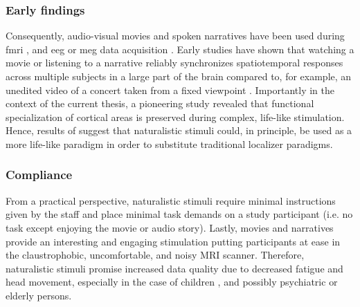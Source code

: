 \subsubsection{Early findings}
Consequently, audio-visual movies and spoken narratives have been used during
\ac{fmri} \citep[cf.][for reviews]{hamilton2018revolution,
hasson2008neurocinematics, sonkusare2019naturalistic,
saarimaki2021naturalistic}, and \ac{eeg} or \ac{meg} data acquisition
\citep[s.][for reviews]{alday2019meg, kandylaki2019story}.
Early studies have shown that watching a movie \citep{hasson2004intersubject,
hasson2008neurocinematics, hasson2010reliability} or listening to a narrative
\citep{lerner2011topographic, wilson2008beyond} reliably synchronizes
spatiotemporal responses across multiple subjects in a large part of the brain
compared to, for example, an unedited video of a concert taken from a fixed
viewpoint \citep{hasson2004intersubject, hasson2008neurocinematics,
hasson2010reliability, lerner2011topographic, wilson2008beyond}.
Importantly in the context of the current thesis, a pioneering study
\citep{bartels2004mapping} revealed that functional specialization of cortical
areas is preserved during complex, life-like stimulation.
Hence, results of \citet{bartels2004mapping} suggest that naturalistic stimuli
could, in principle, be used as a more life-like paradigm in order to substitute
traditional localizer paradigms.


\subsubsection{Compliance}

From a practical perspective, naturalistic stimuli require minimal instructions
given by the staff and place minimal task demands on a study participant (i.e.
no task except enjoying the movie or audio story).
%
Lastly, movies and narratives provide an interesting and engaging stimulation
putting participants at ease in the claustrophobic, uncomfortable, and noisy MRI
scanner.
%
Therefore, naturalistic stimuli promise increased data quality due to decreased
fatigue and head movement, especially in the case of children
\citep{vanderwal2015inscapes}, and possibly psychiatric
\citep{eickhoff2020towards} or elderly persons.

